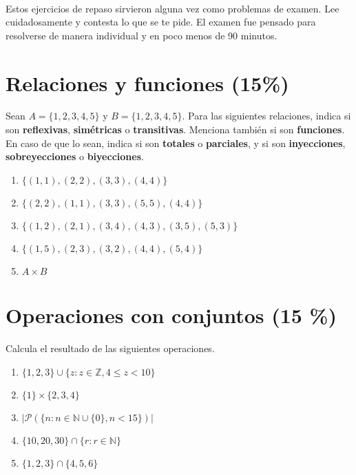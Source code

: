 \documentclass[8pt, onside]{article}
\title{
    \myclass \\
    \textbf{\mytitle} \\
    \myheader
    \date{}
}
\begin{document}
\maketitle

\vspace{-1.5cm}

Estos ejercicios de repaso sirvieron alguna vez como problemas de examen.
Lee cuidadosamente y contesta lo que se te pide.
El examen fue pensado para resolverse de manera individual y en poco menos de 90 minutos.

\section{Relaciones y funciones (15\%)}

Sean $A = \{1,2,3,4,5\}$ y $B = \{1,2,3,4,5\}$.
Para las siguientes relaciones, indica si son \textbf{reflexivas}, \textbf{simétricas} o \textbf{transitivas}.
Menciona también si son \textbf{funciones}. En caso de que lo sean, indica si son \textbf{totales} o \textbf{parciales}, y si son \textbf{inyecciones}, \textbf{sobreyecciones} o \textbf{biyecciones}.

\begin{enumerate}[label=\tt \alph*)]
    \itemsep0em
    \item $\{(1,1), (2,2), (3,3), (4,4)\}$
    \item $\{(2,2), (1,1), (3,3), (5,5), (4,4)\}$
    \item $\{(1,2), (2,1), (3,4), (4,3), (3,5), (5,3)\}$
    \item $\{(1,5), (2,3), (3,2), (4,4), (5, 4)\}$
    \item $A \times B$
\end{enumerate}


\section{Operaciones con conjuntos (15 \%)}

Calcula el resultado de las siguientes operaciones.

\begin{enumerate}[label=\tt \alph*)]
    \itemsep0em
    \item $\{1, 2, 3\} \cup \{z : z \in \mathbb{Z}, 4 \leq z < 10 \}$
    \item $\{1\} \times \{2,3,4\}$
    \item $|\mathscr{P}(\{n : n \in \mathbb{N} \cup \{0\}, n < 15\})|$
    \item $\{10, 20, 30\} \cap \{r : r \in \mathbb{N}\}$
    \item $\{1, 2, 3\} \cap \{4, 5, 6\}$
\end{enumerate}
\end{document}
